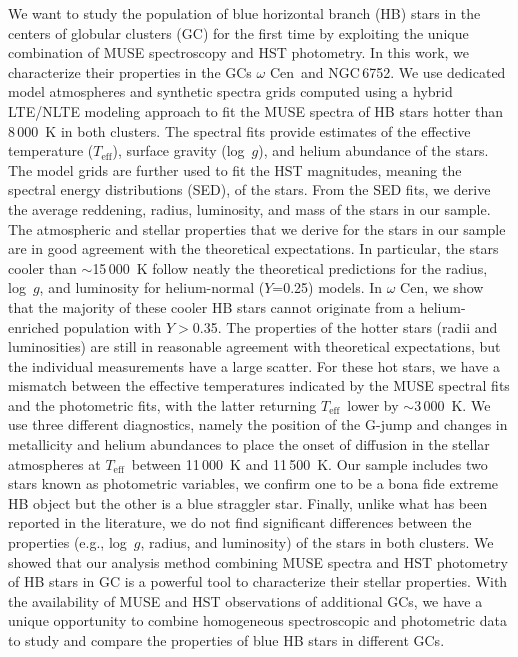 \documentclass{aa}
\newcommand{\teff}{$T_{\text{eff}}$}
\newcommand{\Cen}{$\omega$ Cen}
\begin{document}
  \abstract
    {}
   {We want to study the population of blue horizontal branch (HB) stars  in the centers of globular clusters (GC) for the first time by exploiting the unique combination of MUSE spectroscopy and HST photometry. In this work, we characterize their properties in the GCs \Cen\ and NGC\,6752. 
         }
   { We use dedicated model atmospheres and synthetic spectra grids computed using a hybrid LTE/NLTE modeling approach to fit the MUSE spectra of HB stars hotter than 8\,000~K in both clusters. The spectral fits provide estimates of the effective temperature (\teff), surface gravity (log~$g$), and helium abundance of the stars. The model grids are further used to fit the HST magnitudes, meaning the spectral energy distributions (SED), of the stars. From the SED fits, we derive the average reddening, radius, luminosity, and mass of the stars in our sample.
         }
   { The atmospheric and stellar properties that we derive for the stars in our sample are in good agreement with the theoretical expectations. In particular, the stars cooler than $\sim$15\,000~K follow neatly the theoretical predictions for the radius, log~$g$, and luminosity for helium-normal ($Y$=0.25) models. In \Cen, we show that the majority of these cooler HB stars cannot originate from a helium-enriched population with $Y>$0.35. 
   The properties of the hotter stars (radii and luminosities) are still in reasonable agreement with theoretical expectations, but the individual measurements have a large scatter. For these hot stars, we have a mismatch between the effective temperatures indicated by the MUSE spectral fits and the photometric fits, with the latter returning \teff\ lower by $\sim$3\,000~K. We use three different diagnostics, namely the position of the G-jump and changes in metallicity and helium abundances to place the onset of diffusion in the stellar atmospheres at \teff\ between 11\,000~K and 11\,500~K. Our sample includes two stars known as photometric variables, we confirm one to be a bona fide extreme HB object but the other is a blue straggler star.
   Finally, unlike what has been reported in the literature, we do not find significant differences between the properties (e.g., log~$g$, radius, and luminosity) of the stars in both clusters.
         }
   {
        We showed that our analysis method combining MUSE spectra and HST photometry of HB stars in GC is a powerful tool to characterize their stellar properties. With the availability of MUSE and HST observations of additional GCs, we have a unique opportunity to combine homogeneous spectroscopic and photometric data to study and compare the properties of blue HB stars in different GCs.   }
      
\end{document}
